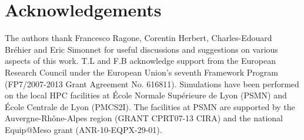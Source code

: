 \documentclass{jfm}
\begin{document}
\section{Acknowledgements}
The authors thank Francesco Ragone, Corentin Herbert, Charles-Edouard Bréhier and Eric Simonnet for useful discussions and suggestions on various aspects of this work.
T.L and F.B acknowledge support from the European Research Council under the European Union's seventh Framework Program (FP7/2007-2013 Grant Agreement No. 616811).
Simulations have been performed on the local HPC facilities at École Normale Supérieure de Lyon (PSMN) and École Centrale de Lyon (PMCS2I).
The facilities at PSMN are supported by the Auvergne-Rhône-Alpes region (GRANT CPRT07-13 CIRA) and the national Equip@Meso grant (ANR-10-EQPX-29-01).

\appendix







\end{document}

